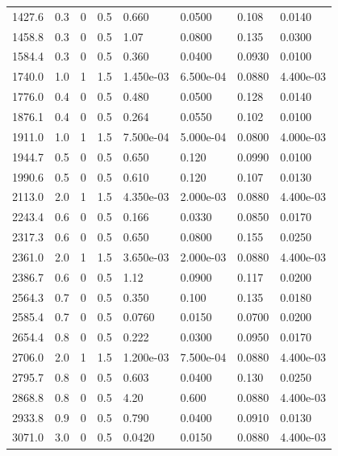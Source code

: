 \documentclass[preview]{standalone}
\begin{document}
{{\begin{tabular}{L{1.2cm}C{1.2cm} C{0.3cm}C{0.5cm} C{1.4cm}C{1.4cm} C{1.4cm}C{1.4cm}}
  1427.6  &   0.3  & 0     & 0.5 &  0.660  & 0.0500  & 0.108 &  0.0140   \\ 
  1458.8  &   0.3  & 0     & 0.5 &  1.07  & 0.0800  & 0.135 &  0.0300   \\ 
  1584.4  &   0.3  & 0     & 0.5 &  0.360  & 0.0400  & 0.0930 &  0.0100   \\ 
  1740.0  &   1.0  & 1     & 1.5 &  1.450e-03  & 6.500e-04  & 0.0880 &  4.400e-03   \\ 
  1776.0  &   0.4  & 0     & 0.5 &  0.480  & 0.0500  & 0.128 &  0.0140   \\ 
  1876.1  &   0.4  & 0     & 0.5 &  0.264  & 0.0550  & 0.102 &  0.0100   \\ 
  1911.0  &   1.0  & 1     & 1.5 &  7.500e-04  & 5.000e-04  & 0.0800 &  4.000e-03   \\ 
  1944.7  &   0.5  & 0     & 0.5 &  0.650  & 0.120  & 0.0990 &  0.0100   \\ 
  1990.6  &   0.5  & 0     & 0.5 &  0.610  & 0.120  & 0.107 &  0.0130   \\ 
  2113.0  &   2.0  & 1     & 1.5 &  4.350e-03  & 2.000e-03  & 0.0880 &  4.400e-03   \\ 
  2243.4  &   0.6  & 0     & 0.5 &  0.166  & 0.0330  & 0.0850 &  0.0170   \\ 
  2317.3  &   0.6  & 0     & 0.5 &  0.650  & 0.0800  & 0.155 &  0.0250   \\ 
  2361.0  &   2.0  & 1     & 1.5 &  3.650e-03  & 2.000e-03  & 0.0880 &  4.400e-03   \\ 
  2386.7  &   0.6  & 0     & 0.5 &  1.12  & 0.0900  & 0.117 &  0.0200   \\ 
  2564.3  &   0.7  & 0     & 0.5 &  0.350  & 0.100  & 0.135 &  0.0180   \\ 
  2585.4  &   0.7  & 0     & 0.5 &  0.0760  & 0.0150  & 0.0700 &  0.0200   \\ 
  2654.4  &   0.8  & 0     & 0.5 &  0.222  & 0.0300  & 0.0950 &  0.0170   \\ 
  2706.0  &   2.0  & 1     & 1.5 &  1.200e-03  & 7.500e-04  & 0.0880 &  4.400e-03   \\ 
  2795.7  &   0.8  & 0     & 0.5 &  0.603  & 0.0400  & 0.130 &  0.0250   \\ 
  2868.8  &   0.8  & 0     & 0.5 &  4.20  & 0.600  & 0.0880 &  4.400e-03   \\ 
  2933.8  &   0.9  & 0     & 0.5 &  0.790  & 0.0400  & 0.0910 &  0.0130   \\ 
  3071.0  &   3.0  & 0     & 0.5 &  0.0420  & 0.0150  & 0.0880 &  4.400e-03   \\ 

\end{tabular}}}
\end{document}
